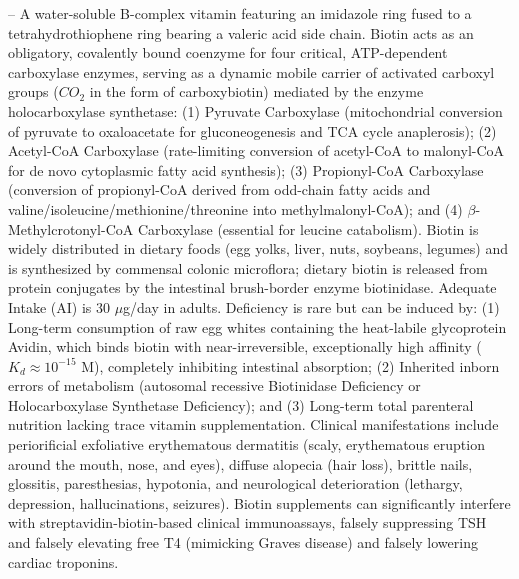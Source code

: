 -- A water-soluble B-complex vitamin featuring an imidazole ring fused to a tetrahydrothiophene ring bearing a valeric acid side chain. Biotin acts as an obligatory, covalently bound coenzyme for four critical, ATP-dependent carboxylase enzymes, serving as a dynamic mobile carrier of activated carboxyl groups ($CO_2$ in the form of carboxybiotin) mediated by the enzyme holocarboxylase synthetase: (1) Pyruvate Carboxylase (mitochondrial conversion of pyruvate to oxaloacetate for gluconeogenesis and TCA cycle anaplerosis); (2) Acetyl-CoA Carboxylase (rate-limiting conversion of acetyl-CoA to malonyl-CoA for de novo cytoplasmic fatty acid synthesis); (3) Propionyl-CoA Carboxylase (conversion of propionyl-CoA derived from odd-chain fatty acids and valine/isoleucine/methionine/threonine into methylmalonyl-CoA); and (4) $\beta$-Methylcrotonyl-CoA Carboxylase (essential for leucine catabolism). Biotin is widely distributed in dietary foods (egg yolks, liver, nuts, soybeans, legumes) and is synthesized by commensal colonic microflora; dietary biotin is released from protein conjugates by the intestinal brush-border enzyme biotinidase. Adequate Intake (AI) is 30 $\mu$g/day in adults. Deficiency is rare but can be induced by: (1) Long-term consumption of raw egg whites containing the heat-labile glycoprotein Avidin, which binds biotin with near-irreversible, exceptionally high affinity ($K_d \approx 10^{-15}$ M), completely inhibiting intestinal absorption; (2) Inherited inborn errors of metabolism (autosomal recessive Biotinidase Deficiency or Holocarboxylase Synthetase Deficiency); and (3) Long-term total parenteral nutrition lacking trace vitamin supplementation. Clinical manifestations include periorificial exfoliative erythematous dermatitis (scaly, erythematous eruption around the mouth, nose, and eyes), diffuse alopecia (hair loss), brittle nails, glossitis, paresthesias, hypotonia, and neurological deterioration (lethargy, depression, hallucinations, seizures). Biotin supplements can significantly interfere with streptavidin-biotin-based clinical immunoassays, falsely suppressing TSH and falsely elevating free T4 (mimicking Graves disease) and falsely lowering cardiac troponins.


